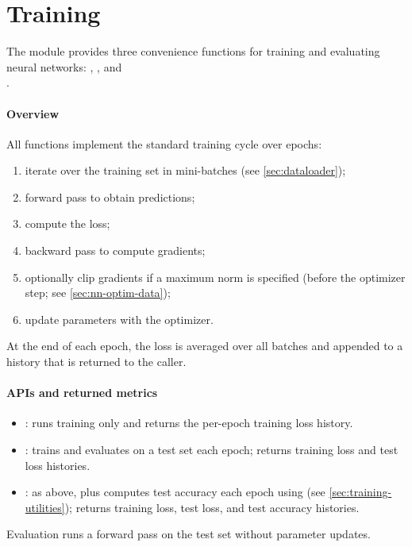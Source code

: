 \section{Training} \label{sec:training}

The  module provides three convenience functions for training and evaluating neural networks: , , and\\.

\paragraph{Overview}
All functions implement the standard training cycle over epochs:
\begin{enumerate}
    \item iterate over the training set in mini-batches (see \cref{sec:dataloader});
    \item forward pass to obtain predictions;
    \item compute the loss;
    \item backward pass to compute gradients;
    \item optionally clip gradients if a maximum norm is specified (before the optimizer step; see \cref{sec:nn-optim-data});
    \item update parameters with the optimizer.
\end{enumerate}
At the end of each epoch, the loss is averaged over all batches and appended to a history that is returned to the caller.

\paragraph{APIs and returned metrics}
\begin{itemize}
    \item {}: runs training only and returns the per-epoch training loss history.
    \item {}: trains and evaluates on a test set each epoch; returns training loss and test loss histories.
    \item {}: as above, plus computes test accuracy each epoch using  (see \cref{sec:training-utilities}); returns training loss, test loss, and test accuracy histories.
\end{itemize}
Evaluation runs a forward pass on the test set without parameter updates.
